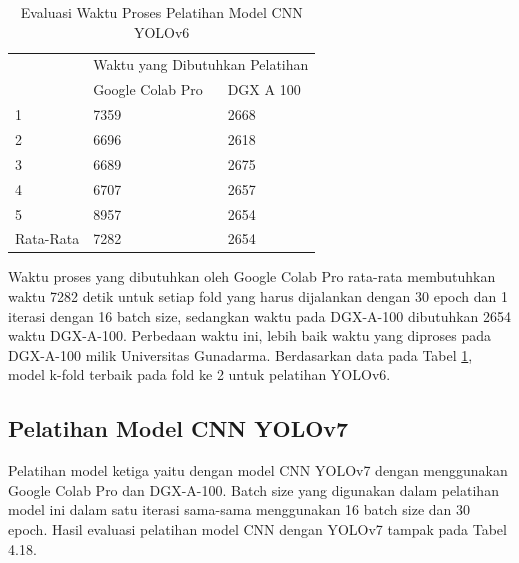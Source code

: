 \begin{singlespace}
	\begin{table}[H]
		\centering
		\caption{Evaluasi Waktu Proses Pelatihan Model CNN YOLOv6}
		\label{tbl:Evaluasi-Waktu-Proses-Pelatihan-Model-CNN-YOLOv6}
		\begin{tabular}{|m{2cm}|m{5cm}m{5cm}|}
			\hline
			\rowcolor[HTML]{D9D9D9} 
			\cellcolor[HTML]{D9D9D9}                       & \multicolumn{2}{l|}{\cellcolor[HTML]{D9D9D9}Waktu yang Dibutuhkan Pelatihan} \\ \cline{2-3} 
			\rowcolor[HTML]{D9D9D9} 
			\multirow{-2}{*}{\cellcolor[HTML]{D9D9D9}Fold} & \multicolumn{1}{l|}{\cellcolor[HTML]{D9D9D9}Google Colab Pro}   & DGX A 100  \\ \hline
			1 & \multicolumn{1}{l|}{7359} & 2668 \\ \hline
			2 & \multicolumn{1}{l|}{6696} & 2618 \\ \hline
			3 & \multicolumn{1}{l|}{6689} & 2675 \\ \hline
			4 & \multicolumn{1}{l|}{6707} & 2657 \\ \hline
			5 & \multicolumn{1}{l|}{8957} & 2654 \\ \hline
			Rata-Rata & \multicolumn{1}{l|}{7282} & 2654 \\ \hline
		\end{tabular}
	\end{table}
\end{singlespace}

Waktu proses yang dibutuhkan oleh Google Colab Pro rata-rata membutuhkan waktu 7282 detik untuk setiap fold yang harus dijalankan dengan 30 epoch dan 1 iterasi dengan 16 batch size, sedangkan waktu pada DGX-A-100 dibutuhkan 2654 waktu DGX-A-100. Perbedaan waktu ini, lebih baik waktu yang diproses pada DGX-A-100 milik Universitas Gunadarma. Berdasarkan data pada Tabel \ref{tbl:Evaluasi-Waktu-Proses-Pelatihan-Model-CNN-YOLOv6}, model k-fold terbaik pada fold ke 2 untuk pelatihan YOLOv6.

\subsection{Pelatihan Model CNN YOLOv7}
\hspace{1,2cm}
Pelatihan model ketiga yaitu dengan model CNN YOLOv7 dengan menggunakan Google Colab Pro dan DGX-A-100. Batch size yang digunakan dalam pelatihan model ini dalam satu iterasi sama-sama menggunakan 16 batch size dan 30 epoch. Hasil evaluasi pelatihan model CNN dengan YOLOv7 tampak pada Tabel 4.18.

